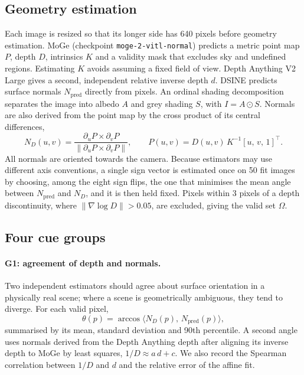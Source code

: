 \documentclass[11pt,a4paper]{article}
\begin{document}
\subsection{Geometry estimation}
\label{sec:estimation}

Each image is resized so that its longer side has 640 pixels before geometry estimation. MoGe \citep{wang2025moge} (checkpoint \texttt{moge-2-vitl-normal}) predicts a metric point map $P$, depth $D$, intrinsics $K$ and a validity mask that excludes sky and undefined regions. Estimating $K$ avoids assuming a fixed field of view. Depth Anything V2 Large \citep{yang2024depthanything2} gives a second, independent relative inverse depth $d$. DSINE \citep{bae2024dsine} predicts surface normals $N_{\mathrm{pred}}$ directly from pixels. An ordinal shading decomposition \citep{careaga2023intrinsic} separates the image into albedo $A$ and grey shading $S$, with $I = A \odot S$. Normals are also derived from the point map by the cross product of its central differences,
\begin{equation}
N_D(u,v) = \frac{\partial_u P \times \partial_v P}{\lVert \partial_u P \times \partial_v P \rVert}, \qquad P(u,v) = D(u,v)\,K^{-1}[u,\,v,\,1]^\top .
\label{eq:normals}
\end{equation}
All normals are oriented towards the camera. Because estimators may use different axis conventions, a single sign vector is estimated once on 50 fit images by choosing, among the eight sign flips, the one that minimises the mean angle between $N_{\mathrm{pred}}$ and $N_D$, and it is then held fixed. Pixels within 3 pixels of a depth discontinuity, where $\lVert\nabla \log D\rVert > 0.05$, are excluded, giving the valid set $\Omega$.

\subsection{Four cue groups}
\label{sec:cues}

\paragraph{G1: agreement of depth and normals.} Two independent estimators should agree about surface orientation in a physically real scene; where a scene is geometrically ambiguous, they tend to diverge. For each valid pixel,
\begin{equation}
\theta(p) = \arccos \big\langle N_D(p),\, N_{\mathrm{pred}}(p) \big\rangle ,
\label{eq:theta}
\end{equation}
summarised by its mean, standard deviation and 90th percentile. A second angle uses normals derived from the Depth Anything depth after aligning its inverse depth to MoGe by least squares, $1/D \approx a\,d + c$. We also record the Spearman correlation between $1/D$ and $d$ and the relative error of the affine fit.
\end{document}
